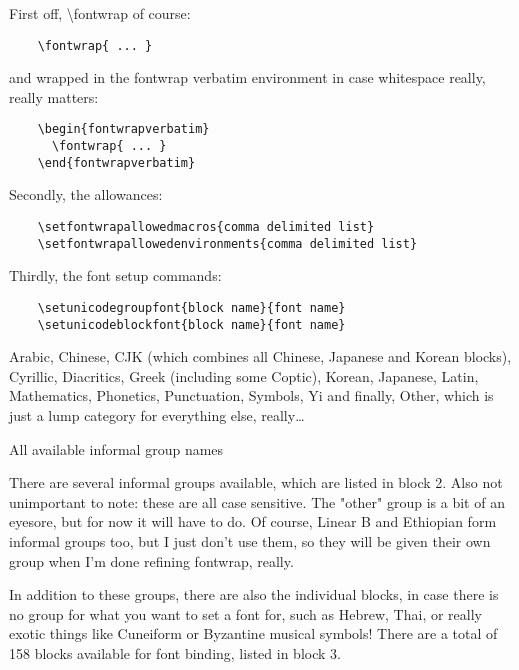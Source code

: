 \documentclass[12pt]{article}
\begin{document}
  First off, \textbackslash fontwrap of course:
  
  \begin{verbatim}
    \fontwrap{ ... }
  \end{verbatim}

  and wrapped in the fontwrap verbatim environment in case whitespace really, really matters:
  
  \begin{verbatim}
    \begin{fontwrapverbatim}
      \fontwrap{ ... }
    \end{fontwrapverbatim}
  \end{verbatim}

  Secondly, the allowances:
  
  \begin{verbatim}
    \setfontwrapallowedmacros{comma delimited list}
    \setfontwrapallowedenvironments{comma delimited list}
  \end{verbatim}
  
  Thirdly, the font setup commands:
  
  \begin{verbatim}
    \setunicodegroupfont{block name}{font name}
    \setunicodeblockfont{block name}{font name}
  \end{verbatim}

  \begin{block}
    Arabic, Chinese, CJK (which combines all Chinese, Japanese
    and Korean blocks), Cyrillic, Diacritics, Greek (including some
    Coptic), Korean, Japanese, Latin, Mathematics, Phonetics, Punctuation,
    Symbols, Yi and finally, Other, which is just a lump category for everything
    else, really\dots
    \caption{All available informal group names}
  \end{block}
  
  There are several informal groups available, which are listed
  in block 2. Also not unimportant to note: these are all case
  sensitive. The "other" group is a bit of an eyesore, but for
  now it will have to do. Of course, Linear B and Ethiopian form
  informal groups too, but I just don't use them, so they will be
  given their own group when I'm done refining fontwrap, really.
  
  In addition to these groups, there are also the individual
  blocks, in case there is no group for what you want to set
  a font for, such as Hebrew, Thai, or really exotic things
  like Cuneiform or Byzantine musical symbols! There are a total
  of 158 blocks available for font binding, listed in block 3.
\end{document}
